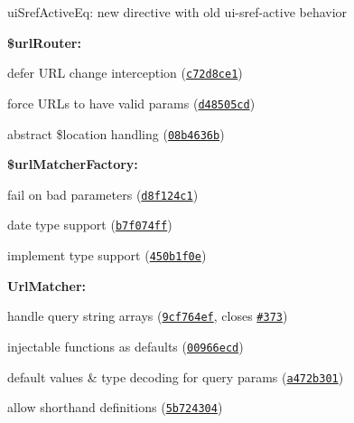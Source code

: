 {{{{\begin{DoxyItemize}
\begin{DoxyItemize}
\begin{DoxyItemize}
\end{DoxyItemize}
\item ui\+Sref\+Active\+Eq\+: new directive with old ui-\/sref-\/active behavior
\end{DoxyItemize}
\item {\bfseries \$url\+Router\+:}
\begin{DoxyItemize}
\item defer U\+RL change interception (\href{https://github.com/angular-ui/ui-router/commit/c72d8ce11916d0ac22c81b409c9e61d7048554d7}{\tt c72d8ce1})
\item force U\+R\+Ls to have valid params (\href{https://github.com/angular-ui/ui-router/commit/d48505cd328d83e39d5706e085ba319715f999a6}{\tt d48505cd})
\item abstract \$location handling (\href{https://github.com/angular-ui/ui-router/commit/08b4636b294611f08db35f00641eb5211686fb50}{\tt 08b4636b})
\end{DoxyItemize}
\item {\bfseries \$url\+Matcher\+Factory\+:}
\begin{DoxyItemize}
\item fail on bad parameters (\href{https://github.com/angular-ui/ui-router/commit/d8f124c10d00c7e5dde88c602d966db261aea221}{\tt d8f124c1})
\item date type support (\href{https://github.com/angular-ui/ui-router/commit/b7f074ff65ca150a3cdbda4d5ad6cb17107300eb}{\tt b7f074ff})
\item implement type support (\href{https://github.com/angular-ui/ui-router/commit/450b1f0e8e03c738174ff967f688b9a6373290f4}{\tt 450b1f0e})
\end{DoxyItemize}
\item {\bfseries Url\+Matcher\+:}
\begin{DoxyItemize}
\item handle query string arrays (\href{https://github.com/angular-ui/ui-router/commit/9cf764efab45fa9309368688d535ddf6e96d6449}{\tt 9cf764ef}, closes \href{https://github.com/angular-ui/ui-router/issues/373}{\tt \#373})
\item injectable functions as defaults (\href{https://github.com/angular-ui/ui-router/commit/00966ecd91fb745846039160cab707bfca8b3bec}{\tt 00966ecd})
\item default values \& type decoding for query params (\href{https://github.com/angular-ui/ui-router/commit/a472b301389fbe84d1c1fa9f24852b492a569d11}{\tt a472b301})
\item allow shorthand definitions (\href{https://github.com/angular-ui/ui-router/commit/5b7243049793505e44b6608ea09878c37c95b1f5}{\tt 5b724304})

\end{DoxyItemize}
\end{DoxyItemize}}}}}
